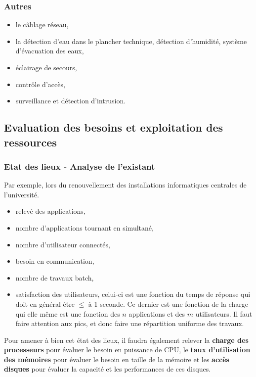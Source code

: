 \documentclass[10pt,a4paper,oneside,titlepage]{report}
\newcommand{\titre}[1]{\textcolor{title}{#1}}
\newcommand{\strong}[1]{\textbf{\titre{#1}}}
\begin{document}
\begin{sffamily}
\subsubsection{Autres}

\begin{itemize}
\item le c\^ablage réseau,
\item la détection d'eau dans le plancher technique, détection d'humidité, système d'évacuation des eaux,
\item éclairage de secours,
\item contr\^ole d'accès,
\item surveillance et détection d'intrusion.
\end{itemize}

\subsection{Evaluation des besoins et exploitation des ressources}

\subsubsection{Etat des lieux - Analyse de l'existant}

Par exemple, lors du renouvellement des installations informatiques centrales de l'université.
\begin{itemize}
\item relevé des applications,
\item nombre d'applications tournant en simultané,
\item nombre d'utilisateur connectés,
\item besoin en communication,
\item nombre de travaux batch,
\item satisfaction des utilisateurs, celui-ci est une fonction du temps de réponse qui doit en général \^etre $\leq$ à 1 seconde. Ce dernier est une fonction de la charge qui elle m\^eme est une fonction des $n$ applications et des $m$ utilisateurs. Il faut faire attention aux pics, et donc faire une répartition uniforme des travaux.
\end{itemize}

Pour amener à bien cet état des lieux, il faudra également relever la \strong{charge des processeurs} pour évaluer le besoin en puissance de CPU, le \strong{taux d'utilisation des mémoires} pour évaluer le besoin en taille de la mémoire et les 
\strong{accès disques} pour évaluer la capacité et les performances de ces disques.


\end{sffamily}
\end{document}
